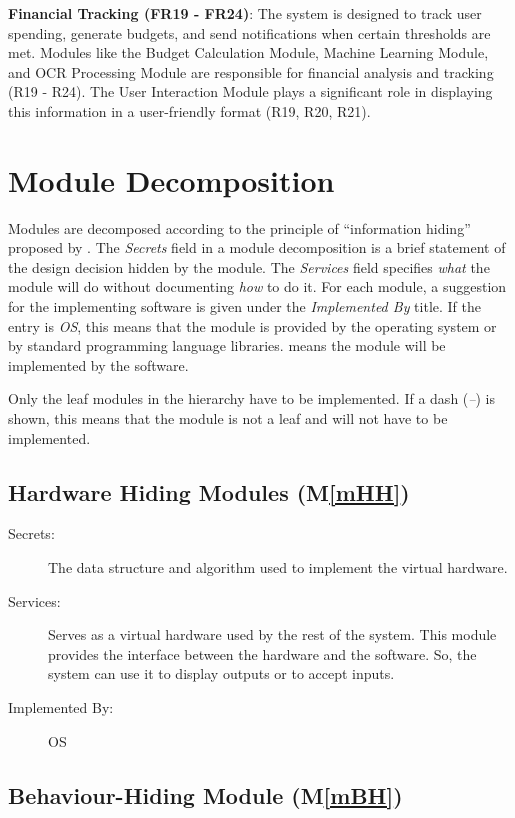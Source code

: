 \documentclass[12pt, titlepage]{article}
\newcommand{\mref}[1]{M\ref{#1}}
\begin{document}
\noindent \textbf{Financial Tracking (FR19 - FR24)}:  
The system is designed to track user spending, generate budgets, and send notifications when certain thresholds are met. Modules like the Budget Calculation Module, Machine Learning Module, and OCR Processing Module are responsible for financial analysis and tracking (R19 - R24). The User Interaction Module plays a significant role in displaying this information in a user-friendly format (R19, R20, R21).

\section{Module Decomposition} \label{SecMD}

Modules are decomposed according to the principle of ``information hiding''
proposed by \citet{ParnasEtAl1984}. The \emph{Secrets} field in a module
decomposition is a brief statement of the design decision hidden by the
module. The \emph{Services} field specifies \emph{what} the module will do
without documenting \emph{how} to do it. For each module, a suggestion for the
implementing software is given under the \emph{Implemented By} title. If the
entry is \emph{OS}, this means that the module is provided by the operating
system or by standard programming language libraries.  \emph{\progname{}} means the
module will be implemented by the \progname{} software.

Only the leaf modules in the hierarchy have to be implemented. If a dash
(\emph{--}) is shown, this means that the module is not a leaf and will not have
to be implemented.

\subsection{Hardware Hiding Modules (\mref{mHH})}

\begin{description}
\item[Secrets:]The data structure and algorithm used to implement the virtual
  hardware.
\item[Services:]Serves as a virtual hardware used by the rest of the
  system. This module provides the interface between the hardware and the
  software. So, the system can use it to display outputs or to accept inputs.
\item[Implemented By:] OS
\end{description}

\subsection{Behaviour-Hiding Module (\mref{mBH})}
\end{document}
